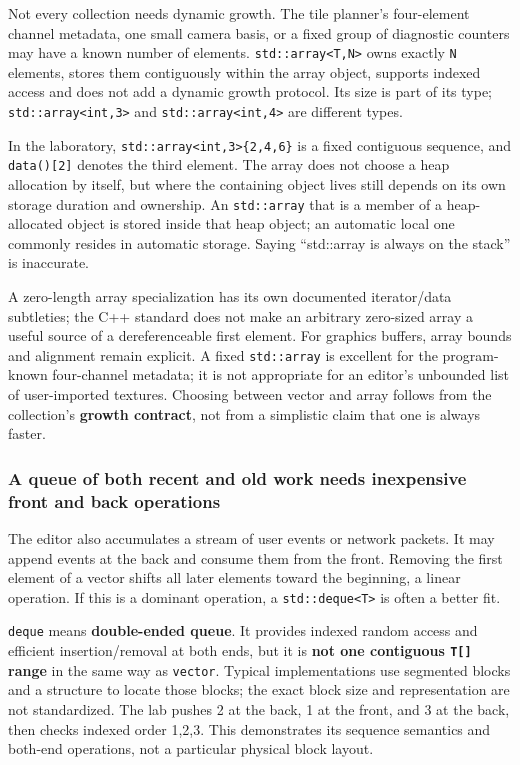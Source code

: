 Not every collection needs dynamic growth. The tile planner's four-element channel metadata, one small camera basis, or a fixed group of diagnostic counters may have a known number of elements. \texttt{std::array\textless{}T,N\textgreater{}} owns exactly \texttt{N} elements, stores them contiguously within the array object, supports indexed access and does not add a dynamic growth protocol. Its size is part of its type; \texttt{std::array\textless{}int,3\textgreater{}} and \texttt{std::array\textless{}int,4\textgreater{}} are different types.

In the laboratory, \texttt{std::array\textless{}int,3\textgreater{}\{2,4,6\}} is a fixed contiguous sequence, and \texttt{data(){[}2{]}} denotes the third element. The array does not choose a heap allocation by itself, but where the containing object lives still depends on its own storage duration and ownership. An \texttt{std::array} that is a member of a heap-allocated object is stored inside that heap object; an automatic local one commonly resides in automatic storage. Saying ``std::array is always on the stack'' is inaccurate.

A zero-length array specialization has its own documented iterator/data subtleties; the C++ standard does not make an arbitrary zero-sized array a useful source of a dereferenceable first element. For graphics buffers, array bounds and alignment remain explicit. A fixed \texttt{std::array} is excellent for the program-known four-channel metadata; it is not appropriate for an editor's unbounded list of user-imported textures. Choosing between vector and array follows from the collection's \textbf{growth contract}, not from a simplistic claim that one is always faster.

\subsubsection{A queue of both recent and old work needs inexpensive front and back operations}\label{a-queue-of-both-recent-and-old-work-needs-inexpensive-front-and-back-operations}

The editor also accumulates a stream of user events or network packets. It may append events at the back and consume them from the front. Removing the first element of a vector shifts all later elements toward the beginning, a linear operation. If this is a dominant operation, a \texttt{std::deque\textless{}T\textgreater{}} is often a better fit.

\texttt{deque} means \textbf{double-ended queue}. It provides indexed random access and efficient insertion/removal at both ends, but it is \textbf{not one contiguous \texttt{T{[}{]}} range} in the same way as \texttt{vector}. Typical implementations use segmented blocks and a structure to locate those blocks; the exact block size and representation are not standardized. The lab pushes 2 at the back, 1 at the front, and 3 at the back, then checks indexed order 1,2,3. This demonstrates its sequence semantics and both-end operations, not a particular physical block layout.

